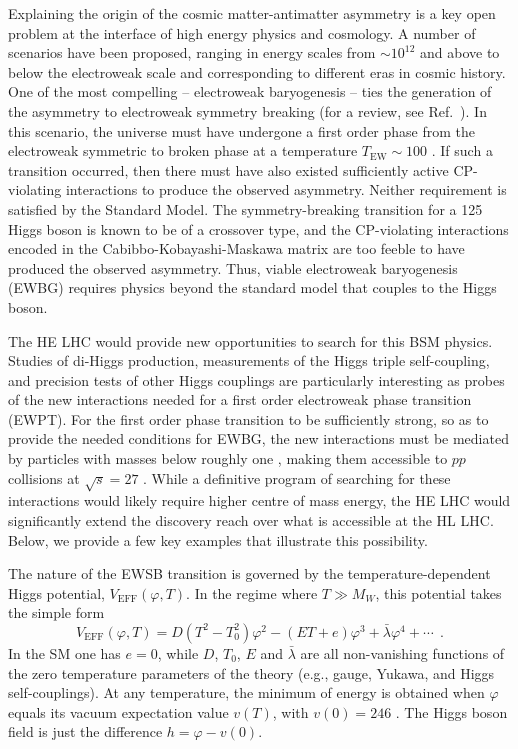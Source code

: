  Explaining the origin of the cosmic matter-antimatter asymmetry is a key open problem at the interface of high energy physics and cosmology. A number of scenarios have been proposed, ranging in energy scales from $\sim 10^{12}$ and above to below the electroweak scale and corresponding to different eras in cosmic history. One of the most compelling -- electroweak baryogenesis --  ties the generation of the asymmetry to electroweak symmetry breaking (for a review, see Ref.~\cite{Morrissey:2012db}). In this scenario, the universe must have undergone a first order phase from the electroweak symmetric to broken phase at a temperature $T_\mathrm{EW} \sim 100$ \UGeV. If such a transition occurred, then there must have also existed sufficiently active CP-violating interactions to produce the observed asymmetry. Neither requirement is satisfied by the Standard Model. The symmetry-breaking transition for a 125 \UGeV Higgs boson is known to be of a crossover type, and the CP-violating interactions encoded in the Cabibbo-Kobayashi-Maskawa matrix are too feeble to have produced the observed asymmetry. Thus, viable electroweak baryogenesis (EWBG) requires physics beyond the standard model that couples to the Higgs boson.

The HE LHC would provide new opportunities to search for this BSM physics. Studies of di-Higgs production, measurements of the Higgs triple self-coupling, and precision tests of other Higgs couplings are particularly interesting as probes of the new interactions needed for a first order electroweak phase transition (EWPT). For the first order phase transition to be sufficiently strong, so as to provide the needed conditions for EWBG, the new interactions must be mediated by particles with masses below roughly one \UTeV, making them accessible to $pp$ collisions at $\sqrt{s} = 27$ \UTeV. While a definitive program of searching for these interactions would likely require higher centre of mass energy, the HE LHC would significantly extend the discovery reach over what is accessible at the HL LHC. Below, we provide a few key examples that illustrate this possibility.

 The nature of the EWSB transition is governed by the temperature-dependent Higgs potential, $V_\mathrm{EFF}(\varphi, T)$. In the regime where $T\gg M_W$, this potential takes the 
simple form
\begin{equation}
V_\mathrm{EFF}(\varphi,T) = D(T^2-T_0^2)\varphi^2 -(ET+e)\varphi^3 + {\bar\lambda}\varphi^4+\cdots ~~.
\label{eq:HiggspotT}
\end{equation}
In the SM one has $e=0$, while $D$, $T_0$, $E$ and ${\bar\lambda}$ are all non-vanishing functions of the zero temperature parameters of the theory (e.g., gauge, Yukawa, and Higgs self-couplings). At any temperature, the minimum of energy is obtained when $\varphi$ equals its vacuum expectation value $v(T)$, with $v(0) = 246$ \UGeV. The Higgs boson field is just the difference $h=\varphi-v(0)$. 

